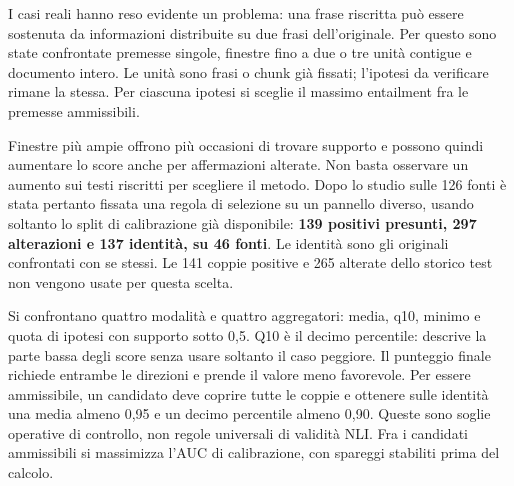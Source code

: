 I casi reali hanno reso evidente un problema: una frase riscritta può essere sostenuta da informazioni distribuite su due frasi dell'originale. Per questo sono state confrontate premesse singole, finestre fino a due o tre unità contigue e documento intero. Le unità sono frasi o chunk già fissati; l'ipotesi da verificare rimane la stessa. Per ciascuna ipotesi si sceglie il massimo entailment fra le premesse ammissibili.

Finestre più ampie offrono più occasioni di trovare supporto e possono quindi aumentare lo score anche per affermazioni alterate. Non basta osservare un aumento sui testi riscritti per scegliere il metodo. Dopo lo studio sulle 126 fonti è stata pertanto fissata una regola di selezione su un pannello diverso, usando soltanto lo split di calibrazione già disponibile: \textbf{139 positivi presunti, 297 alterazioni e 137 identità, su 46 fonti}. Le identità sono gli originali confrontati con se stessi. Le 141 coppie positive e 265 alterate dello storico test non vengono usate per questa scelta.

Si confrontano quattro modalità e quattro aggregatori: media, q10, minimo e quota di ipotesi con supporto sotto 0,5. Q10 è il decimo percentile: descrive la parte bassa degli score senza usare soltanto il caso peggiore. Il punteggio finale richiede entrambe le direzioni e prende il valore meno favorevole. Per essere ammissibile, un candidato deve coprire tutte le coppie e ottenere sulle identità una media almeno 0,95 e un decimo percentile almeno 0,90. Queste sono soglie operative di controllo, non regole universali di validità NLI. Fra i candidati ammissibili si massimizza l'AUC di calibrazione, con spareggi stabiliti prima del calcolo.

